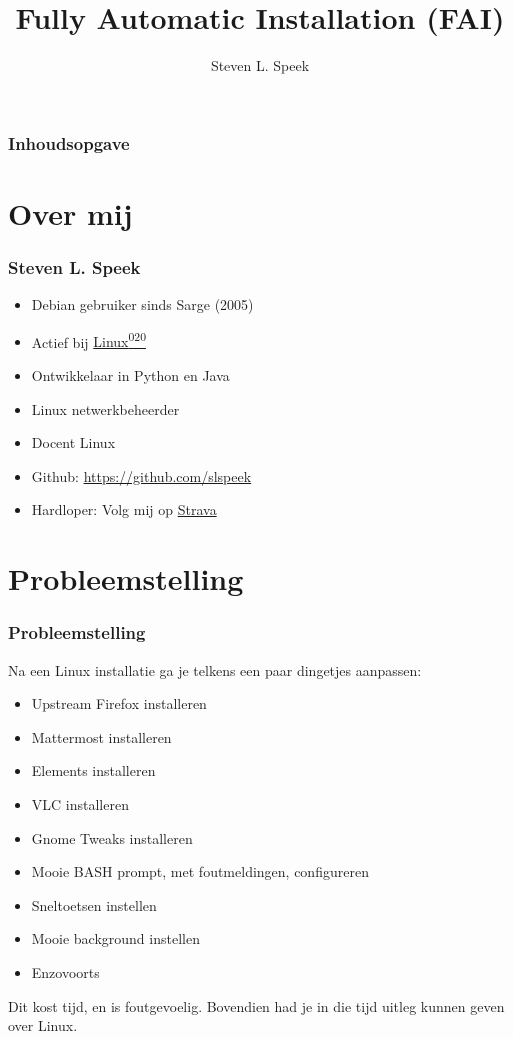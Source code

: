 \documentclass{beamer}
\title[Fully Automatic Install] %
{Fully Automatic Installation (FAI)}
\author[S.L.Speek] %
{Steven L. Speek}
\institute[NLLGG] %
{
  Nederlandse Linux Gebruikers Groep 
}
\date{\displaydate{date}}
\begin{document}
\frame{\titlepage}


\begin{frame}
\frametitle{Inhoudsopgave}
\tableofcontents
\end{frame}


\section{Over mij}

\begin{frame}
\frametitle{Steven L. Speek}
\begin{itemize}
  \item Debian gebruiker sinds Sarge (2005)
  \item Actief bij \href{https://linux020.nl/}{Linux\textsuperscript{020}}
  \item Ontwikkelaar in Python en Java  
  \item Linux netwerkbeheerder
  \item Docent Linux
  \item Github: \url{https://github.com/slspeek}
  \item Hardloper: Volg mij op \href{https://www.strava.com/athletes/123214921}{Strava}
\end{itemize}

\end{frame}
\section{Probleemstelling}
\begin{frame}
\frametitle{Probleemstelling}
Na een Linux installatie ga je telkens een paar dingetjes aanpassen:
\begin{itemize}
  \item Upstream Firefox installeren
  \item Mattermost installeren
  \item Elements installeren
  \item VLC installeren
  \item Gnome Tweaks installeren
  \item Mooie BASH prompt, met foutmeldingen, configureren
  \item Sneltoetsen instellen
  \item Mooie background instellen
  \item Enzovoorts
\end{itemize}
Dit kost tijd, en is foutgevoelig. Bovendien had je in die tijd uitleg kunnen geven over Linux.
\end{frame}
\end{document}
